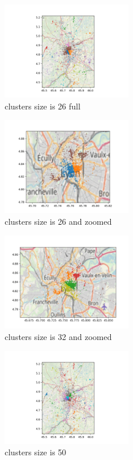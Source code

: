 \documentclass{article}
\begin{document}
\begin{figure}[!h]
  \centering
  \includegraphics[width=0.5\textwidth]{clustering_26_full.png}
  \caption{clusters size is 26 full}
	\label{fig:clusters_26_full}
\end{figure}

\begin{figure}[!h]
  \centering
  \includegraphics[width=0.5\textwidth]{clustering_26_zoomed.png}
  \caption{clusters size is 26 and zoomed}
	\label{fig:clusters_26_zoomed}
\end{figure}

\begin{figure}[!h]
  \centering
  \includegraphics[width=0.5\textwidth]{clustering_32_zoomed.png}
  \caption{clusters size is 32 and zoomed}
	\label{fig:clusters_32_zoomed}
\end{figure}

\begin{figure}[!h]
  \centering
  \includegraphics[width=0.5\textwidth]{clustering_50.png}
  \caption{clusters size is 50}
	\label{fig:clusters_50}
\end{figure}
\end{document}

